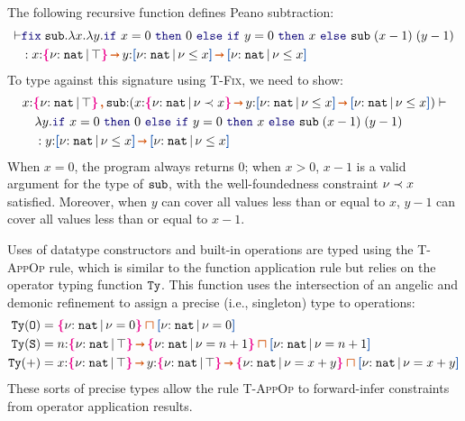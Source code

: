   \begin{example} The following recursive function
    defines Peano subtraction:
\vspace{-0.2em}
\begin{align*}
    \vdash &\zzfix{\Code{sub}}{x}{\zzlam{y}{\zif{x = 0}{0}{\zif{y = 0}{x}{\Code{sub}\;(x - 1)\;(y - 1)}}}}
    \\& : x{:}\ort{\Nat}{\top} \ctsarr y{:}\urt{\Nat}{\vnu \leq x} \ctsarr \urt{\Nat}{\vnu \leq x}
\end{align*}
  \noindent To type  against this signature using
  \textsc{T-Fix}, we need to show: \vspace{-0.2em}
\begin{align*}
  &x{:}\ort{\Nat}{\top} \ctcomma \Code{sub}{:} (x{:}\ort{\Nat}{\vnu \prec x} \ctsarr y{:}\urt{\Nat}{\vnu \leq x} \ctsarr \urt{\Nat}{\vnu \leq x})  \vdash
  \\ &\quad \zzlam{y}{\zif{x = 0}{0}{\zif{y = 0}{x}{\Code{sub}\;(x - 1)\;(y - 1)}}}
    \\&\quad  : y{:}\urt{\Nat}{\vnu \leq x} \ctsarr \urt{\Nat}{\vnu \leq x}
\end{align*}\noindent
When $x = 0$, the program always returns $0$; when $x > 0$, $x - 1$ is a valid argument for the type of ${\tt sub}$, with the well-foundedness constraint $\nu \prec x$ satisfied. Moreover, when $y$ can cover all values less than or equal to $x$, $y - 1$ can cover all values less than or equal to $x - 1$.
  \end{example}

  Uses of datatype constructors and built-in operations are typed
  using the \textsc{T-AppOp} rule, which is similar to the function
  application rule but relies on the operator typing function
  ${\tt Ty}$. This function uses the intersection of an angelic and
  demonic refinement to assign a precise (i.e., singleton) type to
  operations: %
\vspace{-0.2em}
\begin{align*}
  \Code{Ty}(\Code{O}) &= \ort{\Nat}{\vnu = 0} \interty \urt{\Nat}{\vnu = 0} \\
  \Code{Ty}(\Code{S}) &= n{:}\ort{\Nat}{\top} \ctsarr \ort{\Nat}{\vnu = n+1} \interty \urt{\Nat}{\vnu = n + 1} \\
  \Code{Ty}(+) &= x{:}\ort{\Nat}{\top} \ctsarr y{:}\ort{\Nat}{\top} \ctsarr \ort{\Nat}{\vnu = x+y} \interty \urt{\Nat}{\vnu = x + y}
\end{align*}
 These sorts of precise types
allow the rule \textsc{T-AppOp} to forward-infer constraints from
operator application results.


